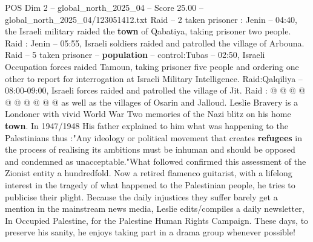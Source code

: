 \begin{textsample}{POS Dim 2 – global\_north\_2025\_04 – Score 25.00 – global\_north\_2025\_04/123051412.txt}
Raid -- 2 taken prisoner : Jenin -- 04:40, the Israeli military raided the \textbf{town} of Qabatiya, taking prisoner two people.
Raid : Jenin -- 05:55, Israeli soldiers raided and patrolled the village of Arbouna.
Raid -- 5 taken prisoner -- \textbf{population} -- control:Tubas -- 02:50, Israeli Occupation forces raided Tamoun, taking prisoner five people and ordering one other to report for interrogation at Israeli Military Intelligence.
Raid:Qalqiliya -- 08:00-09:00, Israeli forces raided and patrolled the village of Jit.
Raid : @ @ @ @ @ @ @ @ @ @ as well as the villages of Osarin and Jalloud.
Leslie Bravery is a Londoner with vivid World War Two memories of the Nazi blitz on his home \textbf{town}.
In 1947/1948 His father explained to him what was happening to the Palestinians thus :"Any ideology or political movement that creates \textbf{refugees} in the process of realising its ambitions must be inhuman and should be opposed and condemned as unacceptable."What followed confirmed this assessment of the Zionist entity a hundredfold.
Now a retired flamenco guitarist, with a lifelong interest in the tragedy of what happened to the Palestinian people, he tries to publicise their plight.
Because the daily injustices they suffer barely get a mention in the mainstream news media, Leslie edits/compiles a daily newsletter, In Occupied Palestine, for the Palestine Human Rights Campaign.
These days, to preserve his sanity, he enjoys taking part in a drama group whenever possible!

\end{textsample}

